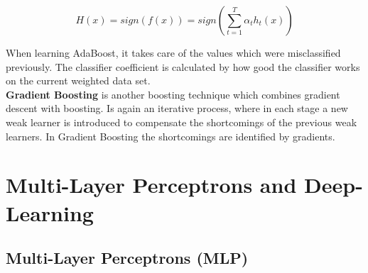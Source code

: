 \documentclass[12pt,a4paper]{article}
\begin{document}
\[H(x) = sign(f(x)) = sign (\sum_{t = 1}^T \alpha_t h_t(x))\]

\noindent When learning AdaBoost, it takes care of the values which were misclassified previously. The classifier coefficient is calculated by how good the classifier works on the current weighted data set.\\[1em]

\textbf{Gradient Boosting} is another boosting technique which combines gradient descent with boosting. Is again an iterative process, where in each stage a new weak learner is introduced to compensate the shortcomings of the previous weak learners. In Gradient Boosting the shortcomings are identified by gradients.






\newpage
\section{Multi-Layer Perceptrons and Deep-Learning}

\subsection{Multi-Layer Perceptrons (MLP)}
\end{document}
